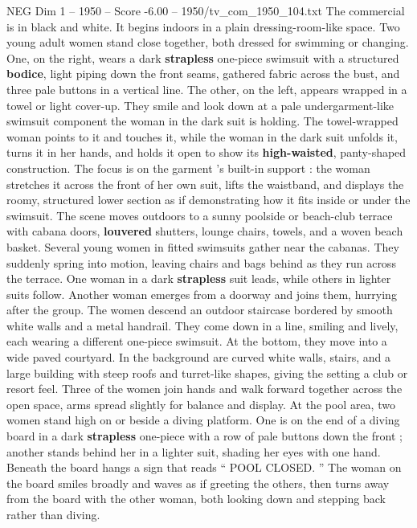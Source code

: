 \begin{textsample}{NEG Dim 1 – 1950 – Score -6.00 – 1950/tv\_com\_1950\_104.txt}  \label{ex:f1_neg_002}
The commercial is in black and white.
It begins indoors in a plain dressing-room-like space.
Two young adult women stand close together, both dressed for swimming or changing.
One, on the right, wears a dark \textbf{strapless} one-piece swimsuit with a structured \textbf{bodice}, light piping down the front seams, gathered fabric across the bust, and three pale buttons in a vertical line.
The other, on the left, appears wrapped in a towel or light cover-up.
They smile and look down at a pale undergarment-like swimsuit component the woman in the dark suit is holding.
The towel-wrapped woman points to it and touches it, while the woman in the dark suit unfolds it, turns it in her hands, and holds it open to show its \textbf{high-waisted}, panty-shaped construction.
The focus is on the garment ’s built-in support : the woman stretches it across the front of her own suit, lifts the waistband, and displays the roomy, structured lower section as if demonstrating how it fits inside or under the swimsuit.
The scene moves outdoors to a sunny poolside or beach-club terrace with cabana doors, \textbf{louvered} shutters, lounge chairs, towels, and a woven beach basket.
Several young women in fitted swimsuits gather near the cabanas.
They suddenly spring into motion, leaving chairs and bags behind as they run across the terrace.
One woman in a dark \textbf{strapless} suit leads, while others in lighter suits follow.
Another woman emerges from a doorway and joins them, hurrying after the group.
The women descend an outdoor staircase bordered by smooth white walls and a metal handrail.
They come down in a line, smiling and lively, each wearing a different one-piece swimsuit.
At the bottom, they move into a wide paved courtyard.
In the background are curved white walls, stairs, and a large building with steep roofs and turret-like shapes, giving the setting a club or resort feel.
Three of the women join hands and walk forward together across the open space, arms spread slightly for balance and display.
At the pool area, two women stand high on or beside a diving platform.
One is on the end of a diving board in a dark \textbf{strapless} one-piece with a row of pale buttons down the front ; another stands behind her in a lighter suit, shading her eyes with one hand.
Beneath the board hangs a sign that reads “ POOL CLOSED. ” The woman on the board smiles broadly and waves as if greeting the others, then turns away from the board with the other woman, both looking down and stepping back rather than diving.

\end{textsample}
